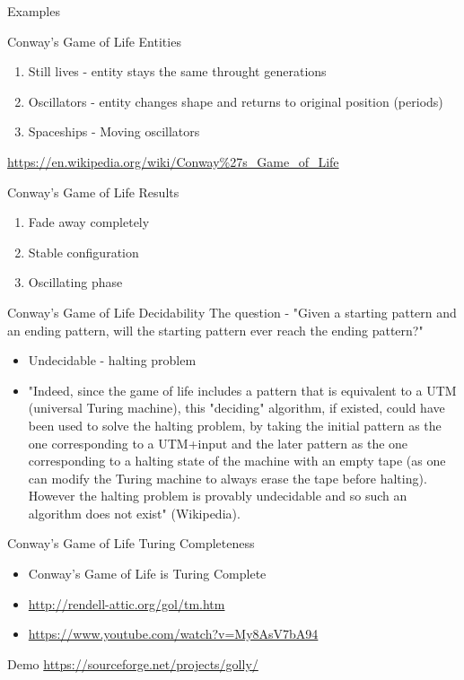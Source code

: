 \documentclass[bigger]{beamer}
\begin{document}
\begin{frame}[label=sec-16]{Examples}
\end{frame}
\begin{frame}[label=sec-17]{Conway's Game of Life Entities}
\begin{enumerate}
\item<1->Still lives - entity stays the same throught generations
\item<2->Oscillators - entity changes shape and returns to original position (periods)
\item<3->Spaceships - Moving oscillators
\end{enumerate}
\url{https://en.wikipedia.org/wiki/Conway\%27s_Game_of_Life}
\end{frame}
\begin{frame}[label=sec-18]{Conway's Game of Life Results}
\begin{enumerate}
\item<1->Fade away completely
\item<2->Stable configuration
\item<3->Oscillating phase
\end{enumerate}
\end{frame}
\begin{frame}[label=sec-19]{Conway's Game of Life Decidability}
The question - "Given a starting pattern and an ending pattern, will the starting pattern ever reach the ending pattern?"
\begin{itemize}
\item<2->Undecidable - halting problem
\item<3->"Indeed, since the game of life includes a pattern that is equivalent to a UTM (universal Turing machine), this "deciding" algorithm, if existed, could have been used to solve the halting problem, by taking the initial pattern as the one corresponding to a UTM+input and the later pattern as the one corresponding to a halting state of the machine with an empty tape (as one can modify the Turing machine to always erase the tape before halting). However the halting problem is provably undecidable and so such an algorithm does not exist" (Wikipedia).
\end{itemize}
\end{frame}
\begin{frame}[label=sec-20]{Conway's Game of Life Turing Completeness}
\begin{itemize}
\item Conway's Game of Life is Turing Complete
\item \url{http://rendell-attic.org/gol/tm.htm}
\item \url{https://www.youtube.com/watch?v=My8AsV7bA94}
\end{itemize}
\end{frame}
\begin{frame}[label=sec-21]{Demo}
\url{https://sourceforge.net/projects/golly/}
\end{frame}
\end{document}
